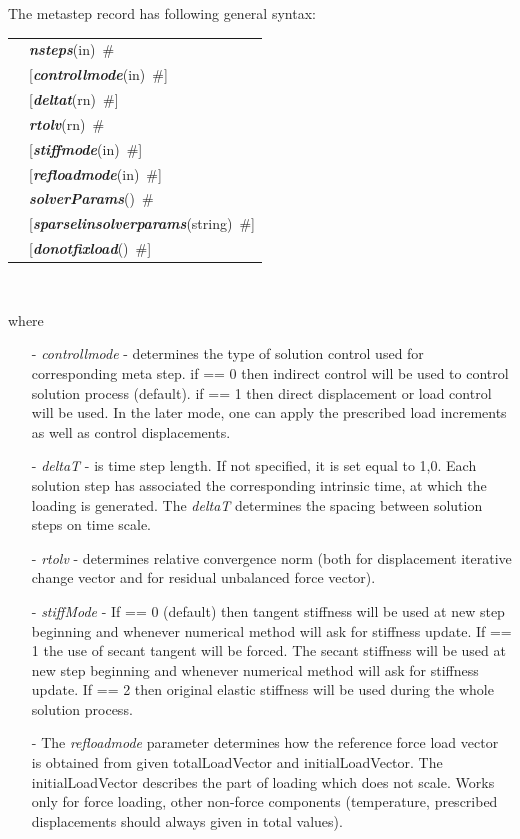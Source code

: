 \documentclass[a4paper]{article}
\makeatletter
\newcommand{\param}[1]{{\em #1}}
\newcommand{\fieldVal}[2]{\mbox{({\it\bf{#1}\#)\tiny (#2)}}}
\newcommand{\keywordnotype}[1]{\mbox{{\it{\bf{#1}}}}}
\newcommand{\keyword}[2]{\mbox{{\keywordnotype{#1}\tiny (#2)}}}
\newcommand{\field}[2]{\mbox{\keyword{#1}{#2}~\#}}
\newcommand{\optField}[2]{\mbox{[\field{#1}{#2}]}}
\newenvironment{record}[1][]{\begin{tabular}{|ll}}{\end{tabular}\\}
\newcommand{\recentry}[2]{{#1}&{#2}\\}
\newcounter{rcc}
\newenvironment{record}[1][\textwidth]{\setcounter{rcc}{0}\begin{tabular*}{#1}{|ll@{\extracolsep{\fill}}r}}{\end{tabular*}\\}
\newcommand{\recentry}[2]{\ifthenelse{\value{rcc}>0}{&$\backslash$ \\}{\setcounter{rcc}{1}}{#1}&{#2}}
\makeatother
\begin{document}
\noindent
The metastep record has following general syntax:\\
\begin{record}
\recentry{\hspace{10mm}}{\field{nsteps}{in}}
\recentry{}{\optField{controllmode}{in}}
\recentry{}{\optField{deltat}{rn}}
\recentry{}{\field{rtolv}{rn}} \recentry{}{\optField{stiffmode}{in}}
\recentry{}{\optField{refloadmode}{in}} \recentry{}{\field{solverParams}{}}
\recentry{}{\optField{sparselinsolverparams}{string}} \recentry{}{\optField{donotfixload}{}}
\end{record}

where 
\begin{itemize}
\item[-] \param{controllmode} - determines the type of solution
control used for corresponding meta step. if == 0 then indirect
control will be used to control solution process (default). if == 1
then direct displacement or load control will be used. In the later
mode, one can apply the prescribed load increments as well as
control displacements.
\item[-] \param{deltaT} - is time step length. If not specified, it is
set equal to 1,0. Each solution step has associated the corresponding
intrinsic time, at which the loading is generated. The \param{deltaT}
determines the spacing between solution steps on time scale. 
\item[-] \param{rtolv} - determines relative convergence norm (both for displacement
iterative change vector and for residual unbalanced force vector).
\item[-] \param{stiffMode} - If == 0 (default) then tangent stiffness will be used
at new step beginning and whenever numerical method will ask for
stiffness update. If == 1 the use of secant tangent will be forced. 
The secant stiffness will be used at new step beginning 
and whenever numerical method will ask for stiffness update.
If == 2 then original elastic stiffness will
be used during the whole solution process.
\item[-] The \param{refloadmode} parameter determines how the reference force load vector 
is obtained from given totalLoadVector and initialLoadVector.
The initialLoadVector describes the part of loading which does not scale. Works only for force loading, other non-force components (temperature, prescribed displacements should always given in total values).

\end{itemize}
\end{document}
